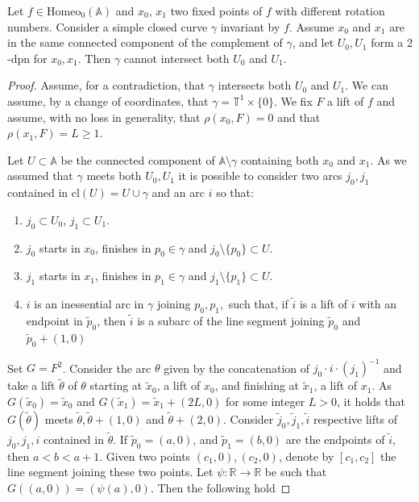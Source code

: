 \documentclass[10pt,a4paper]{amsart}
\newcommand{\A}{\mathbb{A}}
\newcommand{\R}{\mathbb{R}}
\newcommand{\T}{\mathbb{T}}
\begin{document}
\begin{lemma}\label{casocurva}
Let $f\in\mathrm{Homeo}_0(\A)$ and $x_0$, $x_1$ two fixed points of $f$ with different rotation numbers. Consider 
a simple closed curve $\gamma$ invariant by $f$. Assume $x_0$ and $x_1$ are in the same connected component of the complement of $\gamma$, and let $U_0,U_1$ form a $2$-dpn for $x_0,x_1$. Then $\gamma$ cannot intersect both $U_0$ and $U_1$.
\end{lemma}

\begin{proof}
Assume, for a contradiction, that $\gamma$ intersects both $U_0$ and $U_1$. We can assume, by a change of coordinates, that $\gamma=\T^1\times\{0\}$. We fix $F$ a lift of $f$ and assume, with no loss in generality, that $\rho(x_0,F)=0$ and that $\rho(x_1,F)=L\ge 1$.

Let $U\subset\A$ be the connected component of $\A\setminus \gamma$ containing
both $x_0$ and $x_1$. As we assumed that $\gamma$ meets both
$U_0,U_1$ it is possible to consider two arcs $j_0,j_1$
contained in $\textrm{cl}(U)=U \cup \gamma$ and an arc $i$ so that:
\begin{enumerate}
\item $j_0\subset U_0$, $j_1\subset U_1$.
\item $j_0$ starts in $x_0$, finishes in $p_0\in\gamma$ and
$j_0\setminus \{p_0\}\subset U$.
\item $j_1$ starts in $x_1$, finishes in $p_1\in\gamma$ and
$j_1\setminus \{p_1\}\subset U$.
\item $i$ is an inessential arc in $\gamma$ joining $p_0,p_1,$ such that, if $\widetilde i$ is a lift of $i$ with an endpoint in $\widetilde p_0$, then $\widetilde i$ is a subarc of the line segment joining $\widetilde p_0$ and $\widetilde p_0+(1,0)$
\end{enumerate}

Set $G=F^2$. Consider the arc $\theta$ given by the concatenation of $j_0\cdot i\cdot (j_1)^{-1}$ and take a lift
$\widetilde{\theta}$ of $\theta$ starting at $\widetilde{x}_0$, a lift of $x_0$, and finishing
at $\widetilde{x}_1$, a lift of $x_1$. As $G(\widetilde{x}_0)=\widetilde{x}_0$ and
$G(\widetilde{x}_1)=\widetilde{x}_1+(2L,0)$ for some integer $L>0$, it holds that $G(\widetilde{\theta})$ meets
$\widetilde{\theta},\widetilde{\theta}+(1,0)$ and $\widetilde{\theta}+(2,0)$. Consider
$\widetilde{j}_0,\widetilde{j}_1,\widetilde{i}$ respective lifts of $j_0, j_1, i$ contained in $\widetilde{\theta}$.
If $\widetilde{p}_0=(a,0)$, and $\widetilde{p}_1=(b,0)$ are the endpoints of $\widetilde{i}$, then $a<b<a+1$. Given two points $(c_1,0), (c_2,0)$, denote by $[c_1, c_2]$ the line segment joining these two points. Let $\psi:\R\to\R$ be such that $G((a,0))=(\psi(a),0)$. Then the following hold


\end{proof}
\end{document}
